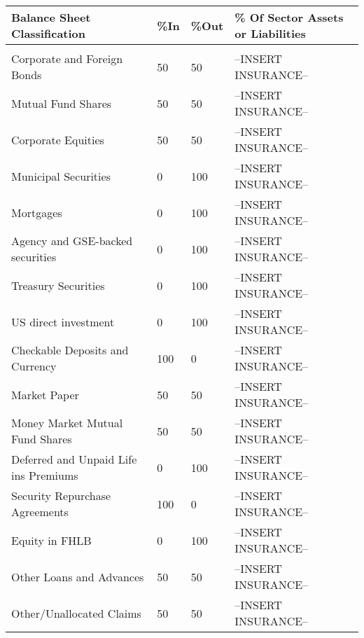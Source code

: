 \begin{longtable}{>{\raggedright}p{10cm}>{\raggedright}p{1cm}>{\raggedright}p{1cm}>{\raggedright}p{4cm}} \label{tab:ffunds_inout} \tabularnewline
Balance Sheet Classification  & \%In  & \%Out & \% Of Sector Assets or Liabilities\tabularnewline
\hline 
\hline 
\multicolumn{3}{l}{Insurance Companies (Assets)}\tabularnewline
\hline 
\hspace*{0.5cm} Corporate and Foreign Bonds & 50 & 50 &  --INSERT INSURANCE-- \tabularnewline
\hspace*{0.5cm} Mutual Fund Shares & 50 & 50 &  --INSERT INSURANCE-- \tabularnewline
\hspace*{0.5cm} Corporate Equities & 50 & 50 &  --INSERT INSURANCE-- \tabularnewline
\hspace*{0.5cm} Municipal Securities & 0 & 100 &  --INSERT INSURANCE-- \tabularnewline
\hspace*{0.5cm} Mortgages & 0 & 100 &  --INSERT INSURANCE-- \tabularnewline
\hspace*{0.5cm} Agency and GSE-backed securities & 0 & 100 &  --INSERT INSURANCE-- \tabularnewline
\hspace*{0.5cm} Treasury Securities & 0 & 100 &  --INSERT INSURANCE-- \tabularnewline
\hspace*{0.5cm} US direct investment & 0 & 100 &  --INSERT INSURANCE-- \tabularnewline
\hspace*{0.5cm} Checkable Deposits and Currency & 100 & 0 &  --INSERT INSURANCE-- \tabularnewline
\hspace*{0.5cm} Market Paper & 50 & 50 &  --INSERT INSURANCE-- \tabularnewline  
\hspace*{0.5cm} Money Market Mutual Fund Shares & 50 & 50 &  --INSERT INSURANCE-- \tabularnewline
\hspace*{0.5cm} Deferred and Unpaid Life ins Premiums & 0 & 100 &  --INSERT INSURANCE-- \tabularnewline
\hspace*{0.5cm} Security Repurchase Agreements & 100 & 0 &  --INSERT INSURANCE-- \tabularnewline
\hspace*{0.5cm} Equity in FHLB & 0 & 100 &  --INSERT INSURANCE-- \tabularnewline
\hspace*{0.5cm} Other Loans and Advances & 50 & 50 &  --INSERT INSURANCE-- \tabularnewline
\hspace*{0.5cm} Other/Unallocated Claims & 50 & 50 &  --INSERT INSURANCE-- \tabularnewline
\hline

\end{longtable}

